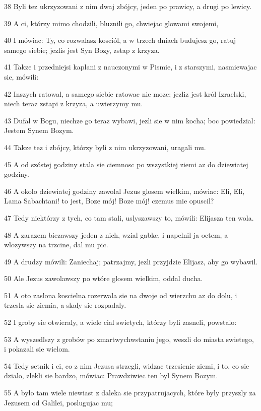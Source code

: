 \par 38 Byli tez ukrzyzowani z nim dwaj zbójcy, jeden po prawicy, a drugi po lewicy.
\par 39 A ci, którzy mimo chodzili, bluznili go, chwiejac glowami swojemi,
\par 40 I mówiac: Ty, co rozwalasz kosciól, a w trzech dniach budujesz go, ratuj samego siebie; jezlis jest Syn Bozy, zstap z krzyza.
\par 41 Takze i przedniejsi kaplani z nauczonymi w Pismie, i z starszymi, nasmiewajac sie, mówili:
\par 42 Inszych ratowal, a samego siebie ratowac nie moze; jezliz jest król Izraelski, niech teraz zstapi z krzyza, a uwierzymy mu.
\par 43 Dufal w Bogu, niechze go teraz wybawi, jezli sie w nim kocha; boc powiedzial: Jestem Synem Bozym.
\par 44 Takze tez i zbójcy, którzy byli z nim ukrzyzowani, uragali mu.
\par 45 A od szóstej godziny stala sie ciemnosc po wszystkiej ziemi az do dziewiatej godziny.
\par 46 A okolo dziewiatej godziny zawolal Jezus glosem wielkim, mówiac: Eli, Eli, Lama Sabachtani! to jest, Boze mój! Boze mój! czemus mie opuscil?
\par 47 Tedy niektórzy z tych, co tam stali, uslyszawszy to, mówili: Elijasza ten wola.
\par 48 A zarazem biezawszy jeden z nich, wzial gabke, i napelnil ja octem, a wlozywszy na trzcine, dal mu pic.
\par 49 A drudzy mówili: Zaniechaj; patrzajmy, jezli przyjdzie Elijasz, aby go wybawil.
\par 50 Ale Jezus zawolawszy po wtóre glosem wielkim, oddal ducha.
\par 51 A oto zaslona koscielna rozerwala sie na dwoje od wierzchu az do dolu, i trzesla sie ziemia, a skaly sie rozpadaly.
\par 52 I groby sie otwieraly, a wiele cial swietych, którzy byli zasneli, powstalo:
\par 53 A wyszedlszy z grobów po zmartwychwstaniu jego, weszli do miasta swietego, i pokazali sie wielom.
\par 54 Tedy setnik i ci, co z nim Jezusa strzegli, widzac trzesienie ziemi, i to, co sie dzialo, zlekli sie bardzo, mówiac: Prawdziwiec ten byl Synem Bozym.
\par 55 A bylo tam wiele niewiast z daleka sie przypatrujacych, które byly przyszly za Jezusem od Galilei, poslugujac mu;
